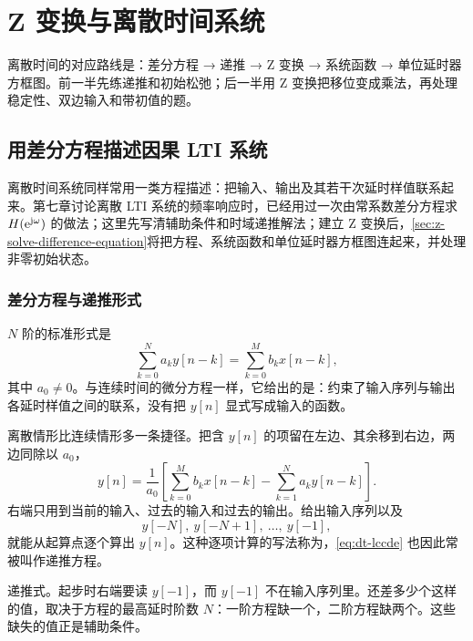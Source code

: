 \chapter{Z 变换与离散时间系统}
\label{chap:z-transform}

离散时间的对应路线是：差分方程 → 递推 → Z 变换 → 系统函数 → 单位延时器方框图。前一半先练递推和初始松弛；后一半用 Z 变换把移位变成乘法，再处理稳定性、双边输入和带初值的题。

\section{用差分方程描述因果 LTI 系统}
\label{sec:dt-difference-equation}

离散时间系统同样常用一类方程描述：把输入、输出及其若干次延时样值联系起来。第七章讨论离散 LTI 系统的频率响应时，已经用过一次由常系数差分方程求 $H(\mathrm{e}^{\mathrm{j}\omega})$ 的做法；这里先写清辅助条件和时域递推解法；建立 Z 变换后，\cref{sec:z-solve-difference-equation}将把方程、系统函数和单位延时器方框图连起来，并处理非零初始状态。

\subsection{差分方程与递推形式}

$N$ 阶的标准形式是
\begin{equation}
  \sum_{k=0}^{N}a_ky[n-k]=\sum_{k=0}^{M}b_kx[n-k],
  \label{eq:dt-lccde}
\end{equation}
其中 $a_0\neq0$。与连续时间的微分方程一样，它给出的是：约束了输入序列与输出各延时样值之间的联系，没有把 $y[n]$ 显式写成输入的函数。

离散情形比连续情形多一条捷径。把含 $y[n]$ 的项留在左边、其余移到右边，两边同除以 $a_0$，
\begin{equation}
  y[n]=\frac1{a_0}\left[\sum_{k=0}^{M}b_kx[n-k]-\sum_{k=1}^{N}a_ky[n-k]\right].
  \label{eq:dt-recursive-form}
\end{equation}
右端只用到当前的输入、过去的输入和过去的输出。给出输入序列以及
\[
  y[-N],\ y[-N+1],\ \ldots,\ y[-1],
\]
就能从起算点逐个算出 $y[n]$。这种逐项计算的写法称为，\cref{eq:dt-lccde} 也因此常被叫作递推方程。

\begin{intuition}[递推为什么需要初始条件]
  递推式。起步时右端要读 $y[-1]$，而 $y[-1]$ 不在输入序列里。还差多少个这样的值，取决于方程的最高延时阶数 $N$：一阶方程缺一个，二阶方程缺两个。这些缺失的值正是辅助条件。
\end{intuition}

